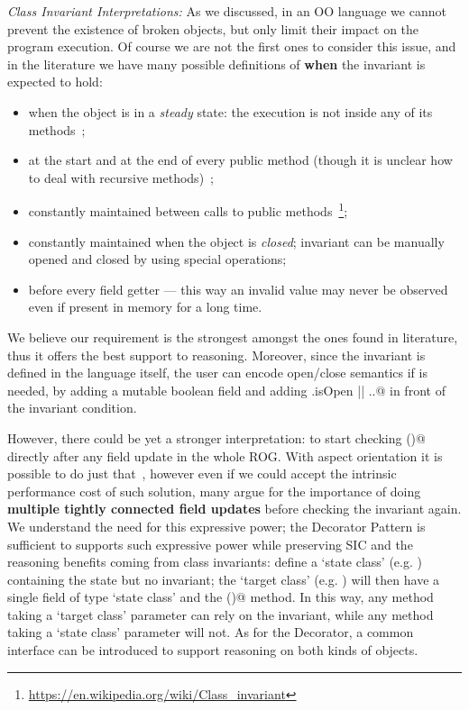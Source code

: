 \noindent\textit{Class Invariant Interpretations:}
As we discussed, in an OO language we cannot prevent the existence of broken objects,
but only limit their impact on the program execution.
Of course we are not the first ones to consider this issue, and in the literature we have many possible definitions
of \textbf{when} the invariant is expected to hold:
\begin{itemize}
\item  when the object is in a \textit{steady} state:
 the execution is not inside any of its methods~\cite{Gopinathan:2008:RMO:1483018.1483028};
\item
at the start and at the end of every public method
(though it is unclear how to deal with recursive methods)~\cite{Burdy2005};
\item
constantly maintained between calls to public methods~\footnote{\url{https://en.wikipedia.org/wiki/Class_invariant}};
\item
constantly maintained when the object is \textit{closed};
invariant can be manually opened and closed by using special operations; %
\item
before every field getter --- this way an invalid value may never be observed
even if present in memory for a long time.
\end{itemize}
\noindent We believe our requirement is the strongest amongst the ones found in literature,
thus it offers the best support to reasoning.
Moreover, since the invariant is defined in the language itself,
the user can encode open/close semantics if is needed,
by adding a mutable boolean \Q@isOpen@ field and adding \Q@this.isOpen || ..@
in front of the invariant condition.

\noindent However, there could be yet a stronger interpretation:
to start checking \Q@invariant()@ directly
after any field update in the whole ROG.
With aspect orientation it is possible to do just that~\cite{Gopinathan:2008:RMO:1483018.1483028},
however even if we could accept the intrinsic performance cost of such solution,
many argue for the importance of
doing \textbf{multiple tightly connected field updates} before checking the invariant again.
We understand the need for this
expressive power; the Decorator Pattern
is sufficient to supports such expressive power while 
preserving SIC and the reasoning benefits coming from 
class invariants:
define a `state class' (e.g. \Q@BoatState@) containing the state but no invariant;
the `target class' (e.g. \Q@Boat@) will then have a single 
\Q@capsule@ field of type `state class' and the \Q@invariant()@ method.
In this way, any method taking a `target class' parameter can
rely on the invariant, while any method taking a `state class' parameter will not.
As for the Decorator, a common interface can be introduced to support reasoning on both kinds of objects.

